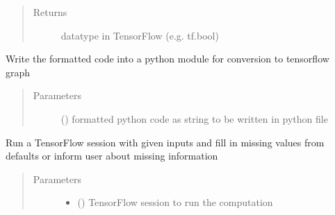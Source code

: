 \documentclass[letterpaper,10pt,english]{sphinxmanual}
\begin{document}
\begin{fulllineitems}
\begin{fulllineitems}
\begin{quote}
\begin{description}
\item[{Returns}] \leavevmode
datatype in TensorFlow   (e.g. tf.bool)

\end{description}\end{quote}

\end{fulllineitems}


\begin{fulllineitems}
\label{\detokenize{index:kChain.kChainModel._makePyFile}}
Write the formatted code into a python module for conversion to tensorflow graph
\begin{quote}\begin{description}
\item[{Parameters}] \leavevmode
{} () \textendash{} formatted python code as string to be written in python file

\end{description}\end{quote}

\end{fulllineitems}


\begin{fulllineitems}
\label{\detokenize{index:kChain.kChainModel._runSessionWithDefaults}}
Run a TensorFlow session with given inputs and fill in missing values from defaults or inform user about missing information
\begin{quote}\begin{description}
\item[{Parameters}] \leavevmode\begin{itemize}
\item {} 
 () \textendash{} TensorFlow session to run the computation


\end{itemize}
\end{description}
\end{quote}
\end{fulllineitems}
\end{fulllineitems}
\end{document}
